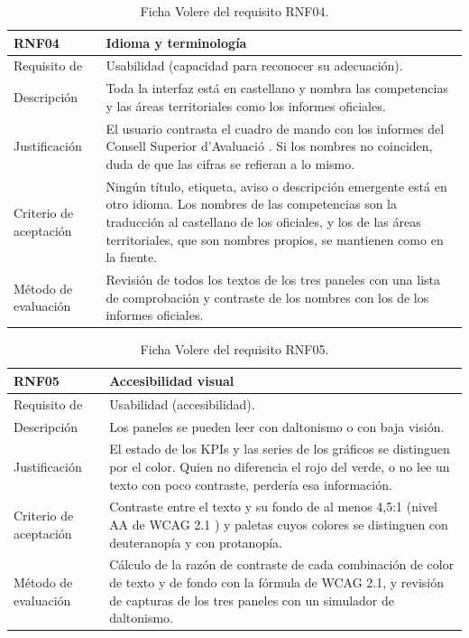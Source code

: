 \documentclass[12pt, a4paper, oneside]{report}
\begin{document}
\begin{table}[!htbp]
\centering
\small
{}\renewcommand{\arraystretch}{1.0}\setlength{\defaultaddspace}{3pt}
\begin{tabularx}{\textwidth}{@{} >{\raggedright\arraybackslash}p{3.4cm} X @{}}
\toprule
\textbf{RNF04} & \textbf{Idioma y terminología} \\ \midrule
Requisito de & Usabilidad (capacidad para reconocer su adecuación). \\ \addlinespace
Descripción & Toda la interfaz está en castellano y nombra las competencias y las áreas territoriales como los informes oficiales. \\ \addlinespace
Justificación & El usuario contrasta el cuadro de mando con los informes del Consell Superior d'Avaluació \cite{csase_resultats}. Si los nombres no coinciden, duda de que las cifras se refieran a lo mismo. \\ \addlinespace
Criterio de aceptación & Ningún título, etiqueta, aviso o descripción emergente está en otro idioma. Los nombres de las competencias son la traducción al castellano de los oficiales, y los de las áreas territoriales, que son nombres propios, se mantienen como en la fuente. \\ \addlinespace
Método de evaluación & Revisión de todos los textos de los tres paneles con una lista de comprobación y contraste de los nombres con los de los informes oficiales. \\ \bottomrule
\end{tabularx}
\caption{Ficha Volere del requisito RNF04.}
\label{tab:rnf04}
\end{table}

\begin{table}[!htbp]
\centering
\small
{}\renewcommand{\arraystretch}{1.0}\setlength{\defaultaddspace}{3pt}
\begin{tabularx}{\textwidth}{@{} >{\raggedright\arraybackslash}p{3.4cm} X @{}}
\toprule
\textbf{RNF05} & \textbf{Accesibilidad visual} \\ \midrule
Requisito de & Usabilidad (accesibilidad). \\ \addlinespace
Descripción & Los paneles se pueden leer con daltonismo o con baja visión. \\ \addlinespace
Justificación & El estado de los KPIs y las series de los gráficos se distinguen por el color. Quien no diferencia el rojo del verde, o no lee un texto con poco contraste, perdería esa información. \\ \addlinespace
Criterio de aceptación & Contraste entre el texto y su fondo de al menos 4,5:1 (nivel AA de WCAG 2.1 \cite{w3c_wcag21}) y paletas cuyos colores se distinguen con deuteranopía y con protanopía. \\ \addlinespace
Método de evaluación & Cálculo de la razón de contraste de cada combinación de color de texto y de fondo con la fórmula de WCAG 2.1, y revisión de capturas de los tres paneles con un simulador de daltonismo. \\ \bottomrule
\end{tabularx}
\caption{Ficha Volere del requisito RNF05.}
\label{tab:rnf05}
\end{table}
\end{document}
